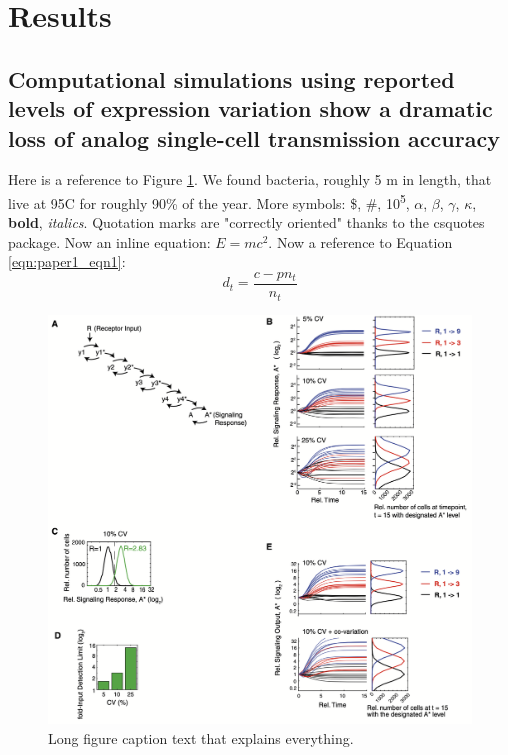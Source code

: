 \section{Results}
\subsection{Computational simulations using reported levels of expression variation show a dramatic loss of analog single-cell transmission accuracy}
Here is a reference to Figure \ref{fig:paper1_fig1}.
We found bacteria, roughly 5 \si{\mu}m in length, that live at 95\degree C for roughly 90\% of the year. More symbols: \$, \#, 10\textsuperscript{5}, $\alpha$, $\beta$, $\gamma$, $\kappa$, \textbf{bold}, \textit{italics}.
Quotation marks are "correctly oriented" thanks to the csquotes package.
Now an inline equation: $E = mc^2$. Now a reference to Equation \ref{eqn:paper1_eqn1}:
\begin{equation}\label{eqn:paper1_eqn1}
d_t = \frac{c - pn_t}{n_t}
\end{equation}

\begin{figure}[hbt!]
\centering
\includegraphics[width=14cm, keepaspectratio]{figs/paper1/fig1.png}
\caption[Short figure caption for List of Figures]{Long figure caption text that explains everything.}
\label{fig:paper1_fig1}
\end{figure}

